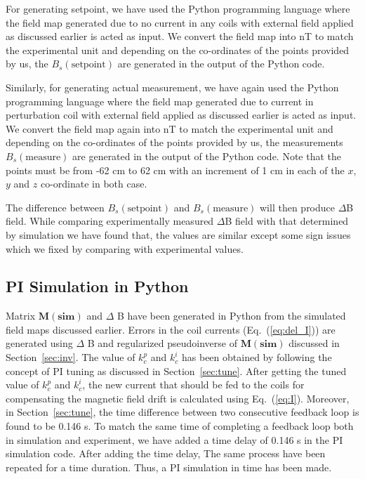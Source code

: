 For generating setpoint, we have used the Python programming language where the field map generated due to no current in any coils with external field applied as discussed earlier is acted as input. We convert the field map into nT to match the experimental unit and depending on the co-ordinates of the points provided by us, the $B_s(\text{setpoint})$ are generated in the output of the Python code. 

Similarly, for generating actual measurement, we have again used the Python programming language where the field map generated due to current in perturbation coil with external field applied as discussed earlier is acted as input. We convert the field map again into nT to match the experimental unit and depending on the co-ordinates of the points provided by us, the measurements $B_s(\text{measure})$ are generated in the output of the Python code. Note that the points must be from -62 cm to 62 cm with an increment of 1 cm in each of the $x$, $y$ and $z$ co-ordinate in both case.


The difference between $B_s(\text{setpoint})$ and $B_s(\text{measure})$ will then produce $\Delta$B field. While comparing experimentally measured $\Delta$B field with that determined by simulation we have found that, the values are similar except some sign issues which we fixed by comparing with experimental values. 

\subsection{PI Simulation in Python}

Matrix $\bm{M(\text{sim})}$ and $\Delta$ B have been generated in Python from the simulated field maps discussed earlier. Errors in the coil currents (Eq.~(\ref{eq:del_I})) are generated using $\Delta$ B and regularized pseudoinverse of $\bm{M(\text{sim})}$ discussed in Section~\ref{sec:inv}. The value of $k_c^p$ and $k_c^i$ has been obtained by following the concept of PI tuning as discussed in Section~\ref{sec:tune}. After getting the tuned value of $k_c^p$ and $k_c^i$, the new current that should be fed to the coils for compensating the magnetic field drift is calculated using Eq.~(\ref{eq:I}). Moreover, in Section~\ref{sec:tune}, the time difference between two consecutive feedback loop is found to be 0.146 s. To match the same time of completing a feedback loop both in simulation and experiment, we have added a time delay of 0.146 s in the PI simulation code. After adding the time delay, The same process have been repeated for a time duration. Thus, a PI simulation in time has been made. 

